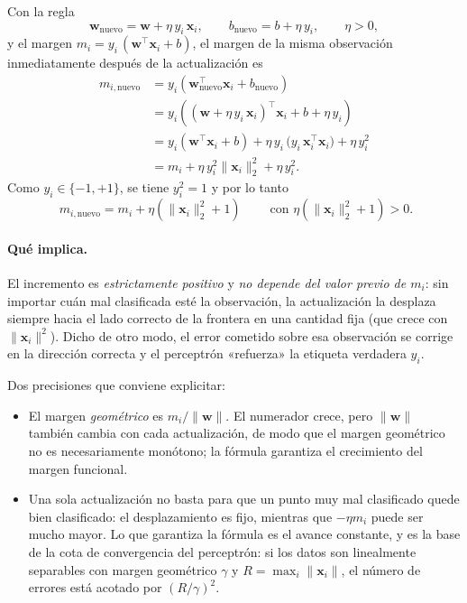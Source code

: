 \documentclass[11pt,a4paper]{article}
\newcommand{\x}{\mathbf{x}}
\newcommand{\w}{\mathbf{w}}
\begin{document}
Con la regla
\begin{equation}
\w_{\text{nuevo}} = \w + \eta\,y_i\,\x_i, \qquad
b_{\text{nuevo}} = b + \eta\,y_i, \qquad \eta > 0,
\end{equation}
y el margen $m_i = y_i\,(\w^\top \x_i + b)$, el margen de la misma observación
inmediatamente después de la actualización es
\begin{align}
m_{i,\text{nuevo}}
&= y_i\left(\w_{\text{nuevo}}^\top \x_i + b_{\text{nuevo}}\right) \nonumber\\
&= y_i\left((\w + \eta\,y_i\,\x_i)^\top \x_i + b + \eta\,y_i\right) \nonumber\\
&= y_i\left(\w^\top \x_i + b\right)
 + \eta\,y_i\,\big(y_i\,\x_i^\top \x_i\big)
 + \eta\,y_i^2 \nonumber\\
&= m_i + \eta\,y_i^2\lVert \x_i\rVert_2^2 + \eta\,y_i^2 .
\end{align}
Como $y_i \in \{-1,+1\}$, se tiene $y_i^2 = 1$ y por lo tanto
\begin{equation}
\boxed{\;m_{i,\text{nuevo}} = m_i + \eta\left(\lVert \x_i\rVert_2^2 + 1\right)\;}
\qquad \text{con } \eta\left(\lVert \x_i\rVert_2^2 + 1\right) > 0 .
\end{equation}

\paragraph{Qué implica.} El incremento es \emph{estrictamente positivo} y
\emph{no depende del valor previo de $m_i$}: sin importar cuán mal clasificada
esté la observación, la actualización la desplaza siempre hacia el lado correcto
de la frontera en una cantidad fija (que crece con $\lVert \x_i\rVert^2$). Dicho
de otro modo, el error cometido sobre esa observación se corrige en la dirección
correcta y el perceptrón «refuerza» la etiqueta verdadera $y_i$.

Dos precisiones que conviene explicitar:
\begin{itemize}
\item El margen \emph{geométrico} es $m_i/\lVert \w \rVert$. El numerador crece,
  pero $\lVert \w \rVert$ también cambia con cada actualización, de modo que el
  margen geométrico no es necesariamente monótono; la fórmula garantiza el
  crecimiento del margen funcional.
\item Una sola actualización no basta para que un punto muy mal clasificado quede
  bien clasificado: el desplazamiento es fijo, mientras que $-\eta m_i$ puede ser
  mucho mayor. Lo que garantiza la fórmula es el avance constante, y es la base
  de la cota de convergencia del perceptrón: si los datos son linealmente
  separables con margen geométrico $\gamma$ y $R=\max_i\lVert \x_i\rVert$, el
  número de errores está acotado por $(R/\gamma)^2$.
\end{itemize}
\end{document}
